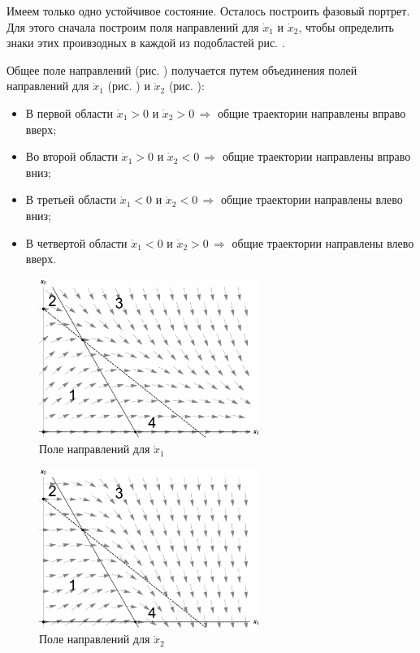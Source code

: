 \documentclass[12pt,a4paper]{article}
\begin{document}
    Имеем только одно устойчивое состояние. Осталось построить фазовый портрет. Для этого сначала построим поля направлений для $ \dot x_1 $ и $ \dot x_2 $, чтобы определить знаки этих проивзодных в каждой из подобластей рис. .

    Общее поле направлений (рис. ) получается путем объединения полей направлений для $ \dot x_1 $ (рис. ) и $ \dot x_2 $ (рис. ):

    \begin{itemize}
        \setlength\itemsep{0.4em}
        \item В первой области $ \dot x_1 > 0 $ и $ \dot x_2 > 0 \, \Rightarrow $ общие траектории направлены вправо вверх;
        \item Во второй области $ \dot x_1 > 0 $ и $ \dot x_2 < 0 \, \Rightarrow $ общие траектории направлены вправо вниз;
        \item В третьей области $ \dot x_1 < 0 $ и $ \dot x_2 < 0 \, \Rightarrow $ общие траектории направлены влево вниз;
        \item В четвертой области $ \dot x_1 < 0 $ и $ \dot x_2 > 0 \, \Rightarrow $ общие траектории направлены влево вверх.
    \end{itemize}

    \begin{figure}[h]
        \centering
        \includegraphics[width=0.64\textwidth]{dirFields_11.pdf}
        \caption{Поле направлений для $ \dot x_1 $}
        \label{fig:dirFields_11}
    \end{figure}

    \begin{figure}[h]
        \centering
        \includegraphics[width=0.64\textwidth]{dirFields_12.pdf}
        \caption{Поле направлений для $ \dot x_2 $}
        \label{fig:dirFields_12}
    \end{figure}
\end{document}
